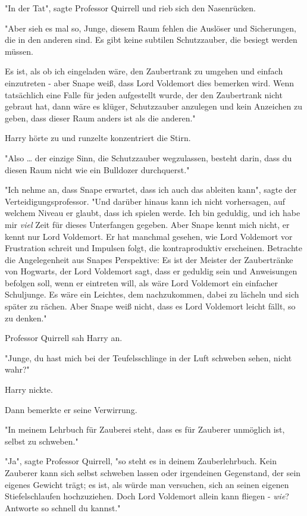 {"In der Tat", sagte Professor Quirrell und rieb sich den Nasenrücken.

"Aber sieh es mal so, Junge, diesem Raum fehlen die Auslöser und Sicherungen, die in den anderen sind. Es gibt keine subtilen Schutzzauber, die besiegt werden müssen.

Es ist, als ob ich eingeladen wäre, den Zaubertrank zu umgehen und einfach einzutreten - aber Snape weiß, dass Lord Voldemort dies bemerken wird. Wenn tatsächlich eine Falle für jeden aufgestellt wurde, der den Zaubertrank nicht gebraut hat, dann wäre es klüger, Schutzzauber anzulegen und kein Anzeichen zu geben, dass dieser Raum anders ist als die anderen."

Harry hörte zu und runzelte konzentriert die Stirn.

"Also … der einzige Sinn, die Schutzzauber wegzulassen, besteht darin, dass du diesen Raum nicht wie ein Bulldozer durchquerst."

"Ich nehme an, dass Snape erwartet, dass ich auch das ableiten kann", sagte der Verteidigungsprofessor. "Und darüber hinaus kann ich nicht vorhersagen, auf welchem Niveau er glaubt, dass ich spielen werde. Ich bin geduldig, und ich habe mir \emph{viel} Zeit für dieses Unterfangen gegeben. Aber Snape kennt mich nicht, er kennt nur Lord Voldemort. Er hat manchmal gesehen, wie Lord Voldemort vor Frustration schreit und Impulsen folgt, die kontraproduktiv erscheinen. Betrachte die Angelegenheit aus Snapes Perspektive: Es ist der Meister der Zaubertränke von Hogwarts, der Lord Voldemort sagt, dass er geduldig sein und Anweisungen befolgen soll, wenn er eintreten will, als wäre Lord Voldemort ein einfacher Schuljunge. Es wäre ein Leichtes, dem nachzukommen, dabei zu lächeln und sich später zu rächen. Aber Snape weiß nicht, dass es Lord Voldemort leicht fällt, so zu denken."

Professor Quirrell sah Harry an.

"Junge, du hast mich bei der Teufelsschlinge in der Luft schweben sehen, nicht wahr?"

Harry nickte.

Dann bemerkte er seine Verwirrung.

"In meinem Lehrbuch für Zauberei steht, dass es für Zauberer unmöglich ist, selbst zu schweben."

"Ja", sagte Professor Quirrell, "so steht es in deinem Zauberlehrbuch. Kein Zauberer kann sich selbst schweben lassen oder irgendeinen Gegenstand, der sein eigenes Gewicht trägt; es ist, als würde man versuchen, sich an seinen eigenen Stiefelschlaufen hochzuziehen. Doch Lord Voldemort allein kann fliegen - \emph{wie}? Antworte so schnell du kannst."

}
